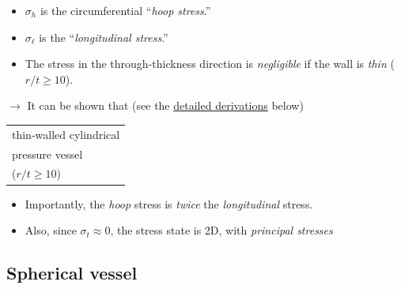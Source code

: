 \documentclass[11pt]{article}
\begin{document}
\medskip
\begin{itemize}[label=$\rightarrow$, itemsep=2pt]
  \item $\sigma_h$ is the circumferential ``\emph{hoop stress}.''
  \item $\sigma_\ell$ is the ``\emph{longitudinal stress}.''
  \item The stress in the through-thickness direction is \emph{negligible} if the wall is
        \emph{thin} ($r/t \ge 10$).
\end{itemize}

\noindent
$\rightarrow$ It can be shown that (see the
\hyperref[w13l3:deriv]{detailed derivations} below)
\begin{center}
\qquad
\begin{tabular}{@{}l@{}}
  thin-walled cylindrical \\ pressure vessel \\ ($r/t \ge 10$)
\end{tabular}
\end{center}

\begin{itemize}[label=$\rightarrow$, itemsep=2pt]
  \item Importantly, the \emph{hoop} stress is \emph{twice} the \emph{longitudinal}
        stress.
  \item Also, since $\sigma_t \approx 0$, the stress state is 2D, with
        \emph{principal stresses}
\end{itemize}
\begin{center}
\end{center}

\subsection*{Spherical vessel}
\end{document}
